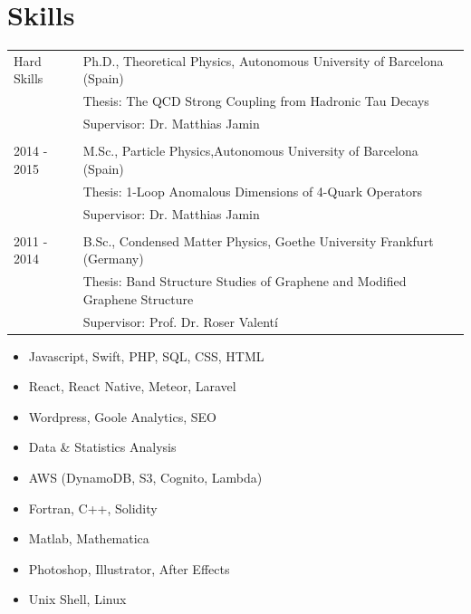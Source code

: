 \documentclass[11pt]{article}
\begin{document}
\section*{Skills}
\begin{tabularx}{\textwidth}{sX}
  Hard Skills  & Ph.D., Theoretical Physics, Autonomous University of
                 Barcelona (Spain) \\
               & Thesis: The QCD Strong Coupling from Hadronic Tau
                 Decays \\
               & Supervisor: Dr. Matthias Jamin \\\\
  2014 - 2015  & M.Sc., Particle Physics,Autonomous University of
                 Barcelona (Spain) \\
               & Thesis: 1-Loop Anomalous Dimensions of 4-Quark
                 Operators \\
               & Supervisor: Dr. Matthias Jamin \\\\
  2011 - 2014  & B.Sc., Condensed Matter Physics, Goethe University Frankfurt (Germany) \\
               & Thesis: Band Structure Studies of Graphene and Modified
                 Graphene Structure \\
               & Supervisor: Prof. Dr. Roser Valentí
\end{tabularx}
\begin{multicols}{2}
  \begin{itemize}
    \renewcommand\labelitemi{-}
  \item Javascript, Swift, PHP, SQL, CSS, HTML 
  \item React, React Native, Meteor, Laravel
  \item Wordpress, Goole Analytics, SEO
  \item Data \& Statistics Analysis
  \item AWS (DynamoDB, S3, Cognito, Lambda)
    \columnbreak
  \item Fortran, C++, Solidity
  \item Matlab, Mathematica
  \item Photoshop, Illustrator, After Effects
  \item Unix Shell, Linux
  \end{itemize}
\end{multicols}
		


\end{document}
